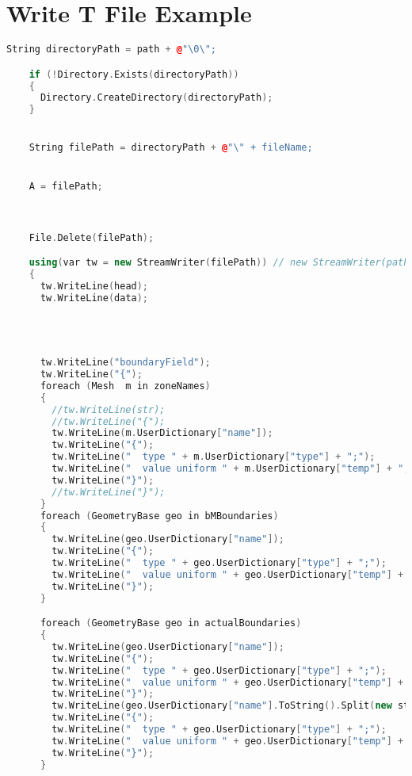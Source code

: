 \begin{theappendices}
\begin{lstlisting}[language=c++, caption=OF text file in System/Brick/fvsolution]
\end{lstlisting}




\singlespacing
\chapter{Write T File Example}
\begin{lstlisting}[language=c++, caption= Code in GH to write OF text file in 0/Brick/T]
  String directoryPath = path + @"\0\";

    if (!Directory.Exists(directoryPath))
    {
      Directory.CreateDirectory(directoryPath);
    }


    String filePath = directoryPath + @"\" + fileName;


    A = filePath;



    File.Delete(filePath);

    using(var tw = new StreamWriter(filePath)) // new StreamWriter(path, true) for append
    {
      tw.WriteLine(head);
      tw.WriteLine(data);




      tw.WriteLine("boundaryField");
      tw.WriteLine("{");
      foreach (Mesh  m in zoneNames)
      {
        //tw.WriteLine(str);
        //tw.WriteLine("{");
        tw.WriteLine(m.UserDictionary["name"]);
        tw.WriteLine("{");
        tw.WriteLine("  type " + m.UserDictionary["type"] + ";");
        tw.WriteLine("  value uniform " + m.UserDictionary["temp"] + ";");
        tw.WriteLine("}");
        //tw.WriteLine("}");
      }
      foreach (GeometryBase geo in bMBoundaries)
      {
        tw.WriteLine(geo.UserDictionary["name"]);
        tw.WriteLine("{");
        tw.WriteLine("  type " + geo.UserDictionary["type"] + ";");
        tw.WriteLine("  value uniform " + geo.UserDictionary["temp"] + ";");
        tw.WriteLine("}");
      }

      foreach (GeometryBase geo in actualBoundaries)
      {
        tw.WriteLine(geo.UserDictionary["name"]);
        tw.WriteLine("{");
        tw.WriteLine("  type " + geo.UserDictionary["type"] + ";");
        tw.WriteLine("  value uniform " + geo.UserDictionary["temp"] + ";");
        tw.WriteLine("}");
        tw.WriteLine(geo.UserDictionary["name"].ToString().Split(new string[] { "_to_" }, StringSplitOptions.None)[1] + "_to_" + geo.UserDictionary["name"].ToString().Split(new string[] { "_to_" }, StringSplitOptions.None)[0]);
        tw.WriteLine("{");
        tw.WriteLine("  type " + geo.UserDictionary["type"] + ";");
        tw.WriteLine("  value uniform " + geo.UserDictionary["temp"] + ";");
        tw.WriteLine("}");
      }


\end{lstlisting}
\end{theappendices}
